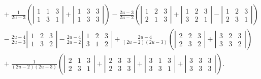 \documentclass[pdftex]{sigma}
\begin{document}
\begin{example}
\begin{gather*}
\qquad{}+\frac{1}{2u-3}\left(
\left\vert\begin{matrix}
1&1&3\\
1&3&1
\end{matrix}\right\vert+
\left\vert\begin{matrix}
1&3&3\\
1&3&3
\end{matrix}\right\vert\right)
%
-\frac{2u-3}{2u-2}\left(
\left\vert\begin{matrix}
1&2&3\\
2&1&3
\end{matrix}\right\vert+
\left\vert\begin{matrix}
1&2&3\\
3&2&1
\end{matrix}\right\vert
-\left\vert\begin{matrix}
1&2&3\\
2&3&1
\end{matrix}\right\vert
\right)\\
\qquad {}-\frac{2u-4}{2u-3}
\left\vert\begin{matrix}
1&2&3\\
1&3&2
\end{matrix}\right\vert
-\frac{2u-4}{2u-2}
\left\vert\begin{matrix}
1&2&3\\
3&1&2
\end{matrix}\right\vert
+\frac{2u-4}{(2u-2)(2u-3)}\left(
\left\vert\begin{matrix}
2&2&3\\
2&3&2
\end{matrix}\right\vert+
\left\vert\begin{matrix}
3&2&3\\
3&3&2
\end{matrix}\right\vert
\right)
\\
\qquad{}+\frac{1}{(2u-2)(2u-3)}\left(
\left\vert\begin{matrix}
2&1&3\\
2&3&1
\end{matrix}\right\vert+
\left\vert\begin{matrix}
2&3&3\\
2&3&3
\end{matrix}\right\vert
+
\left\vert\begin{matrix}
3&1&3\\
3&3&1
\end{matrix}\right\vert
+
\left\vert\begin{matrix}
3&3&3\\
3&3&3
\end{matrix}\right\vert
\right).
\end{gather*}
 \end{example}
\vspace{-1mm}
\end{document}
